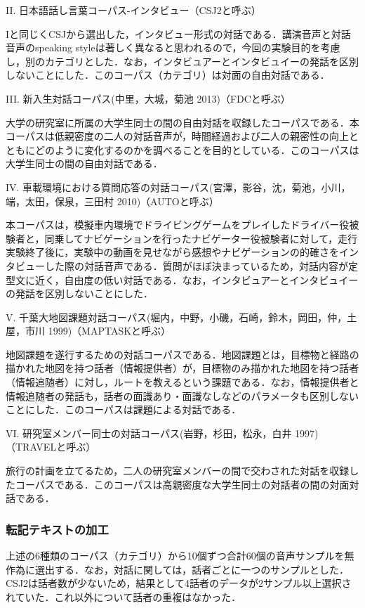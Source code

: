 \documentclass[japanese]{jnlp_1.4}
\begin{document}
\noindent
II. 日本語話し言葉コーパス-インタビュー（CSJ2と呼ぶ）

Iと同じくCSJから選出した，インタビュー形式の対話である．講演音声と対話音声のspeaking styleは著しく異なると思われるので，今回の実験目的を考慮し，別のカテゴリとした．なお，インタビュアーとインタビュイーの発話を区別しないことにした．このコーパス（カテゴリ）は対面の自由対話である．

\noindent
III. 新入生対話コーパス(中里，大城，菊池 2013)（FDCと呼ぶ）

大学の研究室に所属の大学生同士の間の自由対話を収録したコーパスである．本コーパスは低親密度の二人の対話音声が，時間経過および二人の親密性の向上とともにどのように変化するのかを調べることを目的としている．このコーパスは大学生同士の間の自由対話である．

\noindent
IV. 車載環境における質問応答の対話コーパス(宮澤，影谷，沈，菊池，小川，端，太田，保泉，三田村 2010)（AUTOと呼ぶ）

本コーパスは，模擬車内環境でドライビングゲームをプレイしたドライバー役被験者と，同乗してナビゲーションを行ったナビゲーター役被験者に対して，走行実験終了後に，実験中の動画を見せながら感想やナビゲーションの的確さをインタビューした際の対話音声である．質問がほぼ決まっているため，対話内容が定型文に近く，自由度の低い対話である．なお，インタビュアーとインタビュイーの発話を区別しないことにした．

\noindent
V. 千葉大地図課題対話コーパス(堀内，中野，小磯，石崎，鈴木，岡田，仲，土屋，市川 1999)（MAPTASKと呼ぶ）

地図課題を遂行するための対話コーパスである．地図課題とは，目標物と経路の描かれた地図を持つ話者（情報提供者）が，目標物のみ描かれた地図を持つ話者（情報追随者）に対し，ルートを教えるという課題である．なお，情報提供者と情報追随者の発話も，話者の面識あり・面識なしなどのパラメータも区別しないことにした．このコーパスは課題による対話である．

\noindent
VI. 研究室メンバー同士の対話コーパス(岩野，杉田，松永，白井 1997)（TRAVELと呼ぶ）

旅行の計画を立てるため，二人の研究室メンバーの間で交わされた対話を収録したコーパスである．このコーパスは高親密度な大学生同士の対話者の間の対面対話である．


\subsubsection{転記テキストの加工}

上述の6種類のコーパス（カテゴリ）から10個ずつ合計60個の音声サンプルを無作為に選出する．なお，対話に関しては，話者ごとに一つのサンプルとした．CSJ2は話者数が少ないため，結果として4話者のデータが2サンプル以上選択されていた．これ以外について話者の重複はなかった．
\end{document}
